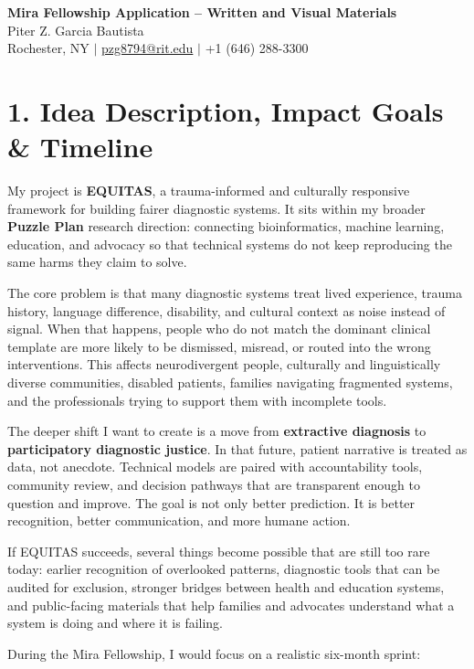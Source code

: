 \documentclass[11pt]{article}
\begin{document}
\begin{center}
{\Large \textbf{Mira Fellowship Application -- Written and Visual Materials}}\\
Piter Z. Garcia Bautista\\
Rochester, NY \quad $|$ \quad \href{mailto:pzg8794@rit.edu}{pzg8794@rit.edu} \quad $|$ \quad +1 (646) 288-3300
\end{center}

\section*{1. Idea Description, Impact Goals \& Timeline}

My project is \textbf{EQUITAS}, a trauma-informed and culturally responsive framework for building fairer diagnostic systems. It sits within my broader \textbf{Puzzle Plan} research direction: connecting bioinformatics, machine learning, education, and advocacy so that technical systems do not keep reproducing the same harms they claim to solve.

The core problem is that many diagnostic systems treat lived experience, trauma history, language difference, disability, and cultural context as noise instead of signal. When that happens, people who do not match the dominant clinical template are more likely to be dismissed, misread, or routed into the wrong interventions. This affects neurodivergent people, culturally and linguistically diverse communities, disabled patients, families navigating fragmented systems, and the professionals trying to support them with incomplete tools.

The deeper shift I want to create is a move from \textbf{extractive diagnosis} to \textbf{participatory diagnostic justice}. In that future, patient narrative is treated as data, not anecdote. Technical models are paired with accountability tools, community review, and decision pathways that are transparent enough to question and improve. The goal is not only better prediction. It is better recognition, better communication, and more humane action.

If EQUITAS succeeds, several things become possible that are still too rare today: earlier recognition of overlooked patterns, diagnostic tools that can be audited for exclusion, stronger bridges between health and education systems, and public-facing materials that help families and advocates understand what a system is doing and where it is failing.

During the Mira Fellowship, I would focus on a realistic six-month sprint:
\end{document}
